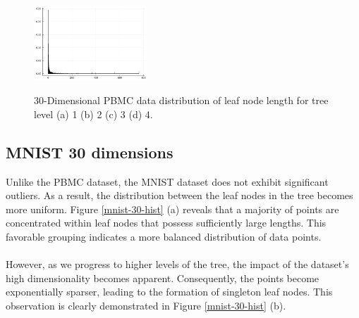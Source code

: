 \documentclass{juliacon}
\begin{document}
\begin{figure}[!ht]
{    \includegraphics[width=10pc]{figures/experiments/pbmc_30/hist_4.png}
  }

  \caption{
    30-Dimensional PBMC data distribution of leaf node length for tree level
    (a) 1 (b) 2 (c) 3 (d) 4.
  }
  \label{pbmc-30-hist}
\end{figure}


\subsection{MNIST 30 dimensions}

Unlike the PBMC dataset, the MNIST dataset does not exhibit significant
outliers. As a result, the distribution between the leaf nodes in the tree
becomes more uniform. Figure \ref{mnist-30-hist} (a) reveals that a majority of
points are concentrated within leaf nodes that possess sufficiently large
lengths. This favorable grouping indicates a more balanced distribution of data
points.
\\\\
However, as we progress to higher levels of the tree, the impact of the
dataset's high dimensionality becomes apparent. Consequently, the points become
exponentially sparser, leading to the formation of singleton leaf nodes.
This observation is clearly demonstrated in Figure \ref{mnist-30-hist} (b).
\end{document}

